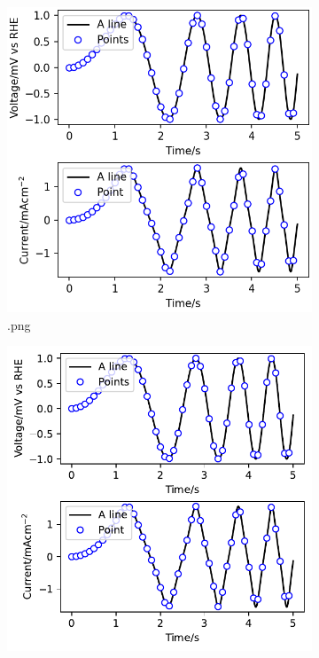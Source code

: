     \begin{figure}
        \begin{subfigure}[t]{0.45\textwidth}
        \includegraphics[width=\linewidth]{./figs/png/example_1}
        \caption{.png}
        \label{figures:fig:exmaple:2:png}
        \end{subfigure}
        \hfill
        \begin{subfigure}[t]{0.45\textwidth}
        \includegraphics[width=\linewidth]{./figs/pdf/example_1}

\end{subfigure}
\end{figure}
